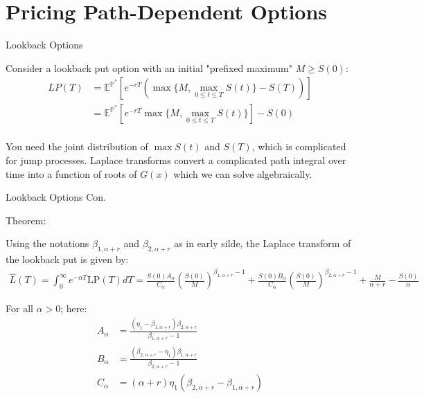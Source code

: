 \documentclass{beamer}
\begin{document}
\section{Pricing Path-Dependent Options}
\begin{frame}{Lookback Options}

    {\footnotesize \footnotesize
    \par Consider a lookback put option with an initial "prefixed maximum" \( M \geq S(0) \):
    \vspace{1em}
    \begin{align*}
        LP(T) &= \mathbb{E}^{\mathbb{P}^*} \left[ e^{-rT} \left( \max\{M, \max_{0 \leq t \leq T} S(t)\} - S(T) \right) \right]\\
        & =   \mathbb{E}^{\mathbb{P}^*}\left[ e^{-rT} \max\{M, \max_{0 \leq t \leq T} S(t)\} \right] - S(0)\\
    \end{align*}

    \par You need the joint distribution of $\max S(t)$ and $S(T)$, which is complicated for jump processes. 
    Laplace transforms convert a complicated path integral over time into a function of roots of $G(x)$
    which we can solve algebraically.
    }
    
\end{frame}

\begin{frame}{Lookback Options Con.}

    \par Theorem:
    {\footnotesize \footnotesize
    
    \vspace{1em}
    \par Using the notations \(\beta_{1,\alpha+r}\) 
    and \(\beta_{2,\alpha+r}\) as in early silde, the Laplace transform of the lookback put is given by:
    \vspace{1em}
    {\footnotesize \tiny
    \begin{align*}
        \hat{L}(T) = \int_0^\infty e^{-\alpha T} \mathrm{LP}(T)  dT = \frac{S(0)A_\alpha}{C_\alpha} \left( \frac{S(0)}{M} \right)^{\beta_{1,\alpha+r}-1} 
        + \frac{S(0)B_\alpha}{C_\alpha} \left( \frac{S(0)}{M} \right)^{\beta_{2,\alpha+r}-1}  
        + \frac{M}{\alpha+r} - \frac{S(0)}{\alpha}
    \end{align*}
    }
    \vspace{1em}
    \par For all \(\alpha > 0\); here:
    \vspace{1em}
    \begin{align*}
        A_\alpha &= \frac{(\eta_1 - \beta_{1,\alpha+r}) \beta_{2,\alpha+r}}{\beta_{1,\alpha+r} - 1} \\
        B_\alpha &= \frac{(\beta_{2,\alpha+r} - \eta_1) \beta_{1,\alpha+r}}{\beta_{2,\alpha+r} - 1}\\
        C_\alpha &= (\alpha + r) \eta_1 (\beta_{2,\alpha+r} - \beta_{1,\alpha+r})
    \end{align*}

    }
    
\end{frame}
\end{document}
